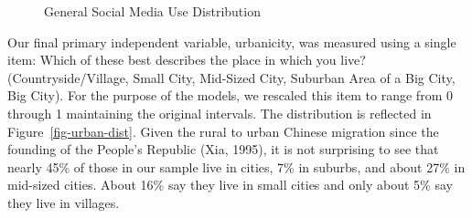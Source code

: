 \documentclass[]{interact}
\theoremstyle{plain}%
\theoremstyle{definition}
\theoremstyle{remark}
\begin{document}
\begin{figure}


\caption{\label{fig-sm-use-dist}General Social Media Use Distribution}

\end{figure}%

Our final primary independent variable, urbanicity, was measured using a
single item: Which of these best describes the place in which you live?
(Countryside/Village, Small City, Mid-Sized City, Suburban Area of a Big
City, Big City). For the purpose of the models, we rescaled this item to
range from 0 through 1 maintaining the original intervals. The
distribution is reflected in Figure~\ref{fig-urban-dist}. Given the
rural to urban Chinese migration since the founding of the People's
Republic (Xia, 1995), it is not surprising to see that nearly 45\% of
those in our sample live in cities, 7\% in suburbs, and about 27\% in
mid-sized cities. About 16\% say they live in small cities and only
about 5\% say they live in villages.
\end{document}
